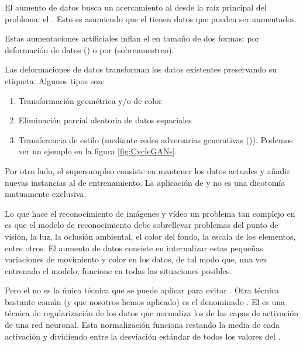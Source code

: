 El aumento de datos busca un acercamiento al  desde la raíz principal del problema: el . Esto es asumiendo que el  tienen datos que pueden ser aumentados.

Estas aumentaciones artificiales inflan el  en tamaño de dos formas: por deformación de datos () o por  (sobremuestreo).

Las deformaciones de datos transforman los datos existentes preservando su etiqueta. Algunos tipos son:

\begin{enumerate}
  \item Transformación geométrica y/o de color
  \item Eliminación parcial aleatoria de datos espaciales
  \item Transferencia de estilo (mediante redes adversarias generativas ()). Podemos ver un ejemplo en la figura \ref{fig:CycleGANs}.
\end{enumerate}

Por otro lado, el supersampleo consiste en mantener los datos actuales y añadir nuevas instancias al  de entrenamiento. La aplicación de  y  no es una dicotomía mutuamente exclusiva.


Lo que hace el reconocimiento de imágenes y vídeo un problema tan complejo en  es que el modelo de reconocimiento debe sobrellevar problemas del punto de visión, la luz, la oclusión ambiental, el color del fondo, la escala de los elementos, entre otros. El aumento de datos consiste en internalizar estas pequeñas variaciones de movimiento y color en los datos, de tal modo que, una vez entrenado el modelo, funcione en todas las situaciones posibles.

Pero el  no es la única técnica que se puede aplicar para evitar . Otra técnica bastante común (y que nosotros hemos aplicado) es el denominado . El  es una técnica de regularización de los datos que normaliza los  de las capas de activación de una red neuronal. Esta normalización funciona restando la media de cada activación y dividiendo entre la desviación estándar de todos los valores del  .
